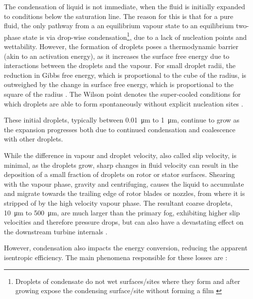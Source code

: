         The condensation of liquid is not immediate, when the fluid is initially expanded to conditions below the saturation line. The reason for this is that for a pure fluid, the only pathway from a an equilibrium vapour state to an equilibrium two-phase state is via drop-wise condensation\footnote{Droplets of condensate do not wet surfaces/sites where they form and after growing expose the condensing surface/site without forming a film \cite{Smith2005}}, due to a lack of nucleation points and wettability. However, the formation of droplets poses a thermodynamic barrier (akin to an activation energy), as it increases the surface free energy due to interactions between the droplets and the vapour. For small droplet radii, the reduction in Gibbs free energy, which is proportional to the cube of the radius, is outweighed by the change in surface free energy, which is proportional to the square of the radius \cite{McDONALD1974}. The Wilson point denotes the super-cooled conditions for which droplets are able to form spontaneously without explicit nucleation sites \cite{gyarmathy1962, McDONALD1974, Azzini2018}.

        These initial droplets, typically between \qty{0.01}{\micro\m} to \qty{1}{\micro\m}, continue to grow as the expansion progresses both due to continued condensation and coalescence with other droplets.
        
        While the difference in vapour and droplet velocity, also called slip velocity, is minimal, as the droplets grow, sharp changes in fluid velocity can result in the deposition of a small fraction of droplets on rotor or stator surfaces. Shearing with the vapour phase, gravity and centrifuging, causes the liquid to accumulate and migrate towards the trailing edge of rotor blades or nozzles, from where it is stripped of by the high velocity vapour phase. The resultant coarse droplets, \qty{10}{\micro\m} to \qty{500}{\micro\m}, are much larger than the primary fog, exhibiting higher slip velocities and therefore pressure drops, but can also have a devastating effect on the downstream turbine internals \cite{Senoo2017}.

        However, condensation also impacts the energy conversion, reducing the apparent isentropic efficiency. The main phenomena responsible for these losses are \cite{Senoo2017}:

